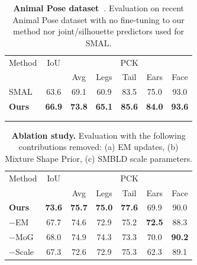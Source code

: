 \begin{table}
\begin{tabular}{@{}lcccccc@{}}
\toprule
\multicolumn{1}{l}{Method} & 
\multicolumn{1}{c}{IoU} & 
\multicolumn{5}{c}{PCK} \\
\multicolumn{2}{c}{} &
\multicolumn{1}{c}{Avg} &
\multicolumn{1}{c}{Legs} &
\multicolumn{1}{c}{Tail} &
\multicolumn{1}{c}{Ears} &
\multicolumn{1}{c}{Face} \\
\midrule
SMAL~\cite{zuffi2017menagerie} & 63.6 & 69.1 & 60.9 & 83.5 & 75.0 & 93.0 \\
\textbf{Ours} & \textbf{66.9} & \textbf{73.8} & \textbf{65.1} & \textbf{85.6} & \textbf{84.0} & \textbf{93.6} \\
\bottomrule
\multicolumn{7}{c}{} \\
\multicolumn{7}{c}{}

\end{tabular}
\caption{
    \label{tab:animalpose}
    \textbf{Animal Pose dataset~\cite{animalpose}}. Evaluation on recent Animal Pose dataset with no fine-tuning to our method nor joint/silhouette predictors used for SMAL.}
\end{table}

\begin{table}
\begin{tabular}{@{}lcccccc@{}}
\toprule
\multicolumn{1}{l}{Method} & 
\multicolumn{1}{c}{IoU} & 
\multicolumn{5}{c}{PCK} \\
\multicolumn{2}{c}{} &
\multicolumn{1}{c}{Avg} &
\multicolumn{1}{c}{Legs} &
\multicolumn{1}{c}{Tail} &
\multicolumn{1}{c}{Ears} &
\multicolumn{1}{c}{Face} \\
\midrule
\textbf{Ours} & \textbf{73.6} & \textbf{75.7} & \textbf{75.0} & \textbf{77.6} & 69.9 & 90.0 \\
$-$EM & 67.7 & 74.6 & 72.9 & 75.2 & \textbf{72.5} & 88.3 \\
$-$MoG & 68.0 & 74.9 & 74.3 & 73.3 & 70.0 & \textbf{90.2} \\ 
$-$Scale & 67.3 & 72.6 & 72.9 & 75.3 & 62.3 & 89.1 \\
\bottomrule 
\end{tabular}
\caption{\label{tab:ablation}\textbf{Ablation study.} Evaluation with the following contributions removed: (a) EM updates, (b) Mixture Shape Prior, (c) SMBLD scale parameters.}
\end{table}


